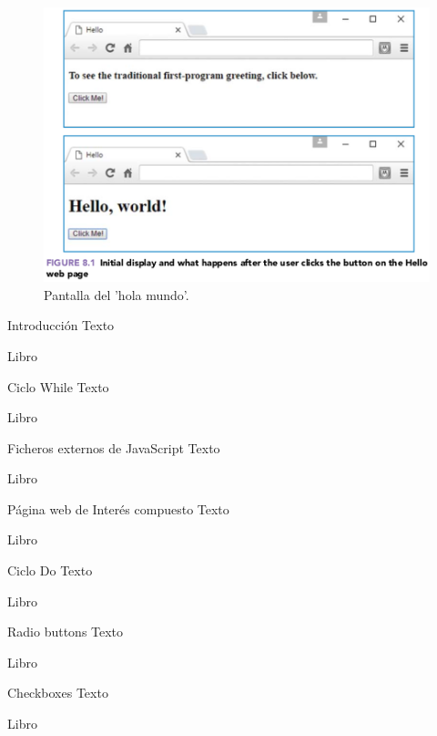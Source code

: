 \begin{figure}[H]
\centering
\includegraphics[scale=0.5]{Section_Files/images/Sec01/01.png}
\caption{Pantalla del 'hola mundo'.}
\end{figure}


\begin{frame}{Introducción}
\justifying
Texto

{\tiny Libro}
\end{frame}

\begin{frame}{Ciclo While}
\justifying
Texto

{\tiny Libro}
\end{frame}

\begin{frame}{Ficheros externos de JavaScript}
\justifying
Texto

{\tiny Libro}
\end{frame}

\begin{frame}{Página web de Interés compuesto}
\justifying
Texto

{\tiny Libro}
\end{frame}

\begin{frame}{Ciclo Do}
\justifying
Texto

{\tiny Libro}
\end{frame}

\begin{frame}{Radio buttons}
\justifying
Texto

{\tiny Libro}
\end{frame}

\begin{frame}{Checkboxes}
\justifying
Texto

{\tiny Libro}
\end{frame}

